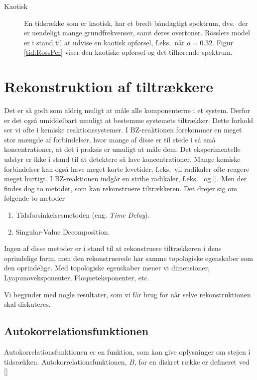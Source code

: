 \begin{description}
  \item[Kaotisk] En tidsr{\ae}kke som er kaotisk, har et
  bredt b{\aa}ndagtigt spektrum, dvs.\ der er uendeligt
  mange grundfrekvenser, samt deres overtoner. R\"{o}sslers
  model er i stand til at udvise en kaotisk opf{\o}rsel,
  f.eks.\ n{\aa}r $a=0.32$. Figur \ref{tid:RossPer} viser
  den kaotiske opf{\o}rsel og det tilh{\o}rende spektrum.

\end{description}

\section{Rekonstruktion af tiltr{\ae}kkere}\label{tid:gendan}
Det er s{\aa} godt som aldrig muligt at m{\aa}le alle
komponenterne i et system. Derfor er det ogs{\aa}
umiddelbart umuligt at bestemme systemets tiltr{\ae}kker.
Dette forhold ser vi ofte i kemiske reaktionssystemer. I
BZ-reaktionen forekommer en meget stor m{\ae}ngde af
forbindelser, hvor mange af disse er til stede i s{\aa}
sm{\aa} koncentrationer, at det i praksis er umuligt at
m{\aa}le dem. Det eksperimentelle udstyr er ikke i stand
til at detektere s{\aa} lave koncentrationer. Mange kemiske
forbindelser kan ogs{\aa} have meget korte levetider,
f.eks.\ vil radikaler ofte reagere meget hurtigt. I
BZ-reaktionen indg{\aa}r en stribe radikaler,
f.eks.\  og  [].
Men der findes dog to metoder, som kan rekonstruere
tiltr{\ae}kkeren. Det drejer sig om f{\o}lgende to metoder

\begin{enumerate}
\item Tidsforsinkelsesmetoden (eng. {\em Time Delay}).
\item Singular-Value Decomposition.
\end{enumerate}

Ingen af disse metoder er i stand til at rekonstruere
tiltr{\ae}kkeren i dens op\-rinde\-lige form, men den
rekonstruerede har samme topologiske egenskaber som den
oprindelige. Med topologiske egenskaber mener vi
dimensioner, Lyapunoveksponenter, Floqueteksponenter, etc.

\vspace{4.0mm}
Vi begynder med nogle resultater, som vi f{\aa}r brug for
n{\aa}r selve rekonstruktionen skal diskuteres.
 
\subsection{Autokorrelationsfunktionen}
Autokorrelationsfunktionen er en funktion, som kan give
oplysninger om st{\o}jen i tidsr{\ae}kken.
Autokorrelationsfunktionen, $B$, for en diskret r{\ae}kke
er defineret ved []

